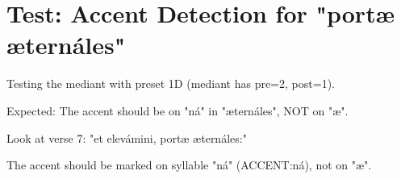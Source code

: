 \documentclass{article}
\begin{document}
\section*{Test: Accent Detection for "portæ æternáles"}

Testing the mediant with preset 1D (mediant has pre=2, post=1).

Expected: The accent should be on "ná" in "æternáles", NOT on "æ".

\bigskip

\noindent{}

\bigskip

Look at verse 7: "et elevámini, portæ æternáles:"

The accent should be marked on syllable "ná" (ACCENT:ná), not on "æ".
\end{document}
